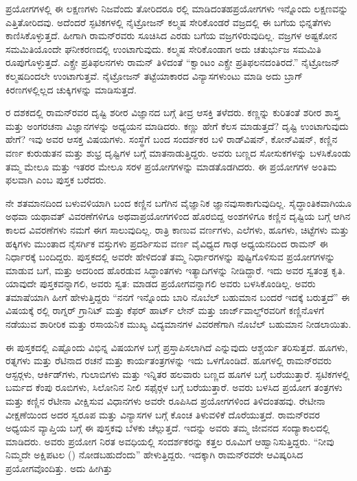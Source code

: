 ಪ್ರಯೋಗಗಳಲ್ಲಿ ಈ ಲಕ್ಷಣಗಳು ನಿಜವೆಂದು ತೋರಿದರೂ ರಲ್ಲಿ ಮಾಡಿದಂತಹ\break ಪ್ರಯೋಗಗಳು ಇನ್ನೊಂದು ಲಕ್ಷಣವನ್ನು ಎತ್ತಿತೋರಿದವು. ಅದೆಂದರೆ ಸ್ಫಟಿಕಗಳಲ್ಲಿ ನೈಟ್ರೋಜನ್ ಕಲ್ಮಷ ಸೇರಿಕೊಂಡರೆ ವಜ್ರದಲ್ಲಿ ಈ ಬಗೆಯ ಭಿನ್ನತೆಗಳು ಕಾಣಿಸಿಕೊಳ್ಳುತ್ತದೆ. ಹೀಗಾಗಿ ರಾಮನ್‍ರವರು ಸೂಚಿಸಿದ ಎರಡು ಬಗೆಯ ವಜ್ರಗಳಿರುವುದಿಲ್ಲ. ವಜ್ರಗಳ ಅಷ್ಟಕೋನ ಸಮಮಿತಿಯೊಂದೇ ಘನೀಕರಣದಲ್ಲಿ ಉಂಟಾಗುವುದು. ಕಲ್ಮಷ ಸೇರಿಕೊಂಡಾಗ ಅದು ಚತುರ್ಭುಜ ಸಮಮಿತಿ ರೂಪುಗೊಳ್ಳುತ್ತದೆ. ಎಕ್ಸ್ರೇ ಪ್ರತಿಫಲನಗಳು ರಾಮನ್ ತಿಳಿದಂತೆ “ಕ್ವಾಂಟಂ ಎಕ್ಸ್ರೇ ಪ್ರತಿಫಲನ\-ದಂತಿರದೆ.” ನೈಟ್ರೋಜನ್ ಕಲ್ಮಷದಿಂದಲೇ ಉಂಟಾಗುತ್ತವೆ. ನೈಟ್ರೋಜನ್ ತಟ್ಟೆಯಾಕಾರದ ವಿನ್ಯಾಸಗಳುಂಟು ಮಾಡಿ ಅದು ಬ್ರಾಗ್ ಕಿರಣಗಳಲ್ಲಿಲ್ಲದ ಚುಕ್ಕಿಗಳನ್ನು ಮಾಡಿಸುತ್ತದೆ.

\newpage


ರ ದಶಕದಲ್ಲಿ ರಾಮನ್‍ರವರ ದೃಷ್ಟಿ ಶರೀರ ವಿಜ್ಞಾನದ ಬಗ್ಗೆ ತೀವ್ರ ಆಸಕ್ತಿ ತಳೆದರು. ಕಣ್ಣನ್ನು ಕುರಿತಂತೆ ಶರೀರ ಶಾಸ್ತ್ರ ಮತ್ತು ಅಂಗರಚನಾ ವಿಜ್ಞಾನಗಳನ್ನು ಅಧ್ಯಯನ ಮಾಡಿದರು. ಕಣ್ಣು ಹೇಗೆ ಕೆಲಸ ಮಾಡುತ್ತದೆ? ದೃಷ್ಟಿ ಉಂಟಾಗುವುದು ಹೇಗೆ? ಇವು ಅವರ ಆಸಕ್ತ ವಿಷಯಗಳು. ಸಂಸ್ಥೆಗೆ ಬಂದ ಸಂದರ್ಶಕರ ಬಳಿ ರಾಡ್‍ವಿಷನ್, ಕೋನ್‍ವಿಷನ್, ಕಣ್ಣಿನ ವರ್ಣ ಕುರುಡುತನ ಮತ್ತು ಶುಭ್ರ ದೃಷ್ಟಿಗಳ ಬಗ್ಗೆ ಮಾತನಾಡುತ್ತಿದ್ದರು. ಅವರು ಬಣ್ಣದ ಸೋಸುಕಗಳನ್ನು ಬಳಸಿಕೊಂಡು ತಮ್ಮ ಮೇಲೂ ಮತ್ತು ಇತರರ ಮೇಲೂ ಸರಳ ಪ್ರಯೋಗಗಳನ್ನು ಮಾಡತೊಡಗಿದರು. ಈ ಪ್ರಯೋಗಗಳ ಅಂತಿಮ ಫಲವಾಗಿ \textit{} ಎಂಬ ಪುಸ್ತಕ ಬರೆದರು.

ನೇ ಶತಮಾನದಿಂದ ಬಳುವಳಿಯಾಗಿ ಬಂದ ಕಣ್ಣಿನ ಬಗೆಗಿನ ವೈಜ್ಞಾನಿಕ ಜ್ಞಾನವು\break ಸಾಕಾಗುವುದಿಲ್ಲ. ಸೈದ್ಧಾಂತಿಕವಾಗಿಯೂ ಅಥವಾ ಯಥಾವತ್ ವಿವರಣೆಗಳಿಗೂ ಅಥವಾ\break ಪ್ರಯೋಗಗಳಿಂದ ಹೊರಬಿದ್ದ ಅಂಶಗಳಿಗೂ ಕಣ್ಣಿನ ದೃಷ್ಟಿಯ ಬಗ್ಗೆ ಆಗಿನ ಕಾಲದ ವಿವರಣೆಗಳು ನಮಗೆ ಈಗ ಸಾಲುವುದಿಲ್ಲ. ರಾತ್ರಿ ಕಾಣುವ ವರ್ಣಗಳು, ಎಲೆಗಳು, ಹೂಗಳು, ಚಿಟ್ಟೆಗಳು ಮತ್ತು ಹಕ್ಕಿಗಳು ಮುಂತಾದ ನೈಸರ್ಗಿಕ ವಸ್ತುಗಳು ಪ್ರದರ್ಶಿಸುವ ವರ್ಣ ವೈವಿಧ್ಯದ ಗಾಢ ಅಧ್ಯಯನದಿಂದ ರಾಮನ್ ಈ ನಿರ್ಧಾರಕ್ಕೆ ಬಂದಿದ್ದರು. ಪುಸ್ತಕದಲ್ಲಿ ಅವರೇ ಹೇಳಿದಂತೆ ತಮ್ಮ ನಿರ್ಧಾರಗಳನ್ನು ಪುಷ್ಟಿಗೊಳಿಸುವ ಪ್ರಯೋಗಗಳನ್ನು ಮಾಡುವ ಬಗೆ, ಮತ್ತು ಅದರಿಂದ ಹೊರಡುವ ಸಿದ್ಧಾಂತಗಳು ಇತ್ಯಾದಿಗಳನ್ನು ನೀಡಿದ್ದಾರೆ. ಇದು ಅವರ ಸ್ವತಂತ್ರ ಕೃತಿ. ಯಾವುದೇ ಪುಸ್ತಕವನ್ನಾಗಲಿ, ಅವರು ಸ್ವತ: ಮಾಡದ ಪ್ರಯೋಗವನ್ನಾಗಲಿ ಅವರು ಬಳಸಿಕೊಂಡಿಲ್ಲ. ಅವರು ತಮಾಷೆಯಾಗಿ ಹೀಗೆ ಹೇಳುತ್ತಿದ್ದರು  “ನನಗೆ ಇನ್ನೊಂದು ಬಾರಿ ನೊಬೆಲ್ ಬಹುಮಾನ ಬಂದರೆ ಇದಕ್ಕೆ ಬರುತ್ತದೆ” ಈ ವಿಷಯಕ್ಕೆ ರಲ್ಲಿ ರಾಗ್ನರ್ ಗ್ರಾನಿಟ್ ಮತ್ತು ಕೆಫರ್ ಹಾರ್ಟ್ ಲೇನ್ ಮತ್ತು ಜಾರ್ಜ್‌ವಾಲ್ಡ್‌ರವರಿಗೆ ಕಣ್ಣಿನೊಳಗೆ ನಡೆಯುವ ಶಾರೀರಿಕ ಮತ್ತು ರಸಾಯನಿಕ ಮುಖ್ಯ ವಿದ್ಯಮಾನಗಳ ವಿವರಣೆಗಾಗಿ ನೊಬೆಲ್ ಬಹುಮಾನ ನೀಡಲಾಯಿತು.

ಈ ಪುಸ್ತಕದಲ್ಲಿ ಎಷ್ಟೊಂದು ವಿಭಿನ್ನ ವಿಷಯಗಳ ಬಗ್ಗೆ ಪ್ರಸ್ತಾಪಿಸಲಾಗಿದೆ ಎನ್ನುವುದು ಆಶ್ಚರ್ಯ ತರಿಸುತ್ತದೆ. ಹೂಗಳು, ರತ್ನಗಳು ಮತ್ತು ರೆಟಿನಾದ ರಚನೆ ಮತ್ತು ಕಾರ್ಯತಂತ್ರಗಳನ್ನು ಇದು ಒಳಗೊಂಡಿದೆ. ಹೂಗಳಲ್ಲಿ ರಾಮನ್‍ರವರು ಆಸ್ಟರ್‍ಗಳು, ಆರ್ಕಿಡ್‍ಗಳು, ಗುಲಾಬಿಗಳು ಮತ್ತು ಇನ್ನಿತರ ಹಲವಾರು ಬಣ್ಣದ ಹೂಗಳ ಬಗ್ಗೆ ಬರೆಯುತ್ತಾರೆ. ಸ್ಫಟಿಕಗಳಲ್ಲಿ ಬರ್ಮದ ಕೆಂಪು ರೂಬಿಗಳು, ಸಿಲೋನಿನ ನೀಲಿ ಸಫೈರ್‍ಗಳ ಬಗ್ಗೆ ಬರೆಯುತ್ತಾರೆ. ಅವರು ಬಳಸಿದ ಪ್ರಯೋಗ ತಂತ್ರಗಳು ಮತ್ತು ಕಣ್ಣಿನ ರೆಟೀನಾ ವೀಕ್ಷಿಸುವ ವಿಧಾನಗಳು ಅವರೇ ರೂಪಿಸಿದ ಪ್ರಯೋಗಗಳಿಂದ ತಿಳಿದಂತಹವು. ರೇಟೀನಾ ವೀಕ್ಷಣೆಯಿಂದ ಅದರ ಸ್ವರೂಪ ಮತ್ತು ವಿನ್ಯಾಸಗಳ ಬಗ್ಗೆ ಕೊಂಚ ತಿಳುವಳಿಕೆ ದೊರೆಯುತ್ತದೆ. ರಾಮನ್‍ರವರ ಅಧ್ಯಯನ ವ್ಯಾಪ್ತಿಯ ಬಗ್ಗೆ ಈ ಪುಸ್ತಕವು ಬೆಳಕು ಚೆಲ್ಲುತ್ತದೆ. ಇದನ್ನು ಅವರು ತಮ್ಮ ಜೀವನದ ಸಂದ್ಯಾಕಾಲದಲ್ಲಿ ಮಾಡಿದರು. ಅವರು ಪ್ರಯೋಗ ನಿರತ ಅವಧಿಯಲ್ಲಿ ಸಂದರ್ಶಕರನ್ನು ಕತ್ತಲ ರೂಮಿಗೆ ಆಹ್ವಾನಿಸುತ್ತಿದ್ದರು. “ನೀವು ನಿಮ್ಮದೇ ಅಕ್ಷಿಪಟಲ () ನೋಡಬಹುದೆಂದು” ಹೇಳುತ್ತಿದ್ದರು. ಇದಕ್ಕಾಗಿ ರಾಮನ್‍ರವರೇ ಆವಿಷ್ಕರಿಸಿದ ಪ್ರಯೋಗವೊಂದಿತ್ತು. ಅದು ಹೀಗಿತ್ತು 

